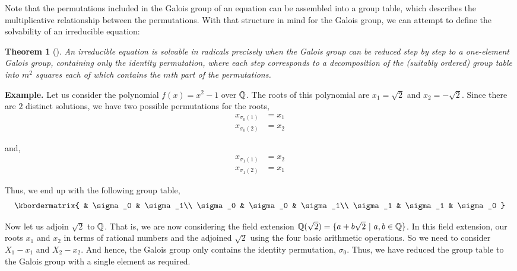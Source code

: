 \documentclass[11pt, a4paper, oneside]{article}
\theoremstyle{plain}
\newtheorem*{thm*}{Theorem}
\theoremstyle{plain}
\theoremstyle{plain}
\theoremstyle{plain}
\theoremstyle{definition}
\theoremstyle{example}
\begin{document}
{\par
Note that the permutations included in the Galois group of an equation can be assembled into a group table, which describes the multiplicative relationship between the permutations. With that structure in mind for the Galois group, we can attempt to define the solvability of an irreducible equation:

\begin{thm*}[{\cite[Thm.\ 9.3]{jorg}}] 
An irreducible equation is solvable in radicals precisely when the Galois group can be reduced step by step to a one-element Galois group, containing only the identity permutation, where each step corresponds to a decomposition of the (suitably ordered) group table into $m^2$ squares each of which contains the $m$th part of the permutations.\end{thm*}

\par
\textbf{Example.} Let us consider the polynomial $f(x) = x^2 - 1$ over $\mathbb{Q}$. The roots of this polynomial are $x_1 = \sqrt{2}$ and $x_2 = -\sqrt{2}$. Since there are $2$ distinct solutions, we have two possible permutations for the roots,
\begin{align*}
x_{\sigma_0(1)} &= x_1\\
x_{\sigma_0(2)} &= x_2
\end{align*}

and,
\begin{align*}
x_{\sigma_1(1)} &= x_2\\
x_{\sigma_1(2)} &= x_1
\end{align*}

Thus, we end up with the following group table,
\begin{align*}
\kbordermatrix{
    & \sigma_0 & \sigma_1\\
    \sigma_0 & \sigma_0 & \sigma_1\\
    \sigma_1 & \sigma_1 & \sigma_0
  }
\end{align*}

Now let us adjoin $\sqrt{2}$ to $\mathbb{Q}$. That is, we are now considering the field extension $\mathbb{Q}(\sqrt{2}) = \{a + b\sqrt{2} \ | \ a,b \in \mathbb{Q}\}$. In this field extension, our roots $x_1$ and $x_2$  in terms of rational numbers and the adjoined $\sqrt{2}$ using the four basic arithmetic operations. So we need to consider $X_1 - x_1$ and $X_2 - x_2$. And hence, the Galois group only contains the identity permutation, $\sigma_0$. Thus, we have reduced the group table to the Galois group with a single element as required.

}
\end{document}

